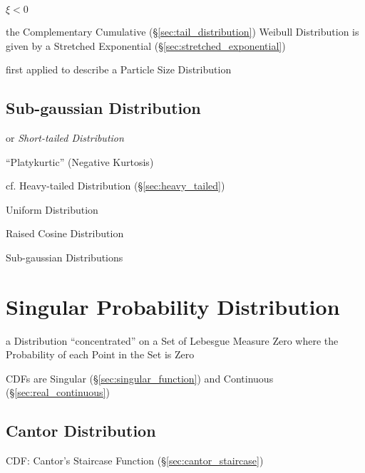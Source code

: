 $\xi < 0$

the Complementary Cumulative (\S\ref{sec:tail_distribution}) Weibull
Distribution is given by a Stretched Exponential
(\S\ref{sec:stretched_exponential})

first applied to describe a Particle Size Distribution



\subsection{Sub-gaussian Distribution}\label{sec:sub_gaussian}

or \emph{Short-tailed Distribution}

``Platykurtic'' (Negative Kurtosis)

cf. Heavy-tailed Distribution (\S\ref{sec:heavy_tailed})

Uniform Distribution

Raised Cosine Distribution

Sub-gaussian Distributions



\section{Singular Probability Distribution}\label{sec:singular_distribution}

a Distribution ``concentrated'' on a Set of Lebesgue Measure Zero where
the Probability of each Point in the Set is Zero

CDFs are Singular (\S\ref{sec:singular_function}) and Continuous
(\S\ref{sec:real_continuous})



\subsection{Cantor Distribution}\label{sec:cantor_distribution}

CDF: Cantor's Staircase Function (\S\ref{sec:cantor_staircase})



